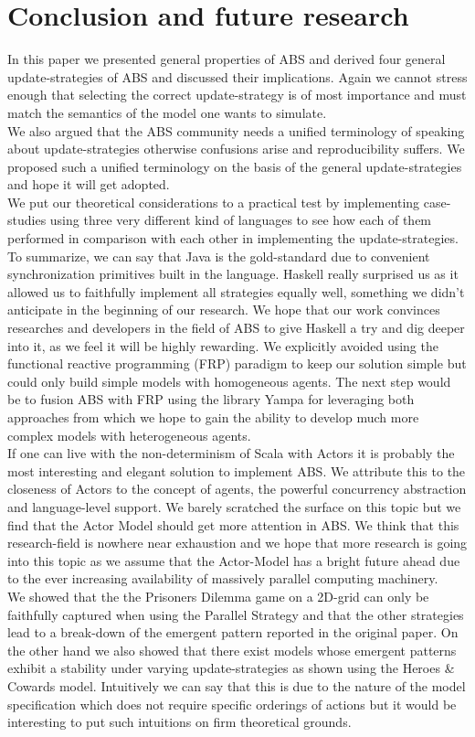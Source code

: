\section{Conclusion and future research}
In this paper we presented general properties of ABS and derived four general update-strategies of ABS and discussed their implications. Again we cannot stress enough that selecting the correct update-strategy is of most importance and must match the semantics of the model one wants to simulate. \\
We also argued that the ABS community needs a unified terminology of speaking about update-strategies otherwise confusions arise and reproducibility suffers. We proposed such a unified terminology on the basis of the general update-strategies and hope it will get adopted. \\
We put our theoretical considerations to a practical test by implementing case-studies using three very different kind of languages to see how each of them performed in comparison with each other in implementing the update-strategies. To summarize, we can say that Java is the gold-standard due to convenient synchronization primitives built in the language. Haskell really surprised us as it allowed us to faithfully implement all strategies equally well, something we didn't anticipate in the beginning of our research. We hope that our work convinces researches and developers in the field of ABS to give Haskell a try and dig deeper into it, as we feel it will be highly rewarding. We explicitly avoided using the functional reactive programming (FRP) paradigm to keep our solution simple but could only build simple models with homogeneous agents. The next step would be to fusion ABS with FRP using the library Yampa for leveraging both approaches from which we hope to gain the ability to develop much more complex models with heterogeneous agents.  \\
If one can live with the non-determinism of Scala with Actors it is probably the most interesting and elegant solution to implement ABS. We attribute this to the closeness of Actors to the concept of agents, the powerful concurrency abstraction and language-level support. We barely scratched the surface on this topic but we find that the Actor Model should get more attention in ABS. We think that this research-field is nowhere near exhaustion and we hope that more research is going into this topic as we assume that the Actor-Model has a bright future ahead due to the ever increasing availability of massively parallel computing machinery. \\
We showed that the the Prisoners Dilemma game on a 2D-grid can only be faithfully captured when using the Parallel Strategy and that the other strategies lead to a break-down of the emergent pattern reported in the original paper. On the other hand we also showed that there exist models whose emergent patterns exhibit a stability under varying update-strategies as shown using the Heroes \& Cowards model. Intuitively we can say that this is due to the nature of the model specification which does not require specific orderings of actions but it would be interesting to put such intuitions on firm theoretical grounds.
